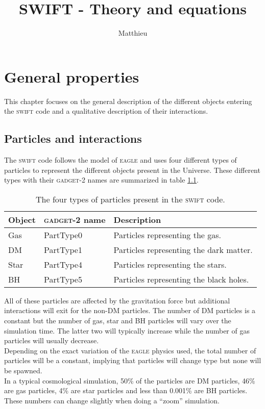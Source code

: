\documentclass[a4paper,10pt]{report}
\title{SWIFT - Theory and equations}
\author{Matthieu}
\newcommand{\swift}{\textsc{swift }}
\newcommand{\eagle}{\textsc{eagle }}
\newcommand{\gadget}{\textsc{gadget-2 }}
\begin{document}
\maketitle





\chapter{General properties}
\label{chap:intro}

This chapter focuses on the general description of the different objects entering the \swift code and a qualitative
description of their interactions.

\section{Particles and interactions}

The \swift code follows the model of \eagle and uses four different types of particles to represent the different
objects present in the Universe. These different types with their \gadget names are summarized in table
\ref{tab:parttypes}.

\begin{table}[h]
\centering

\begin{tabular}{|l|l|l|}
\hline
\textbf{Object} & \textbf{\gadget name} & \textbf{Description} \\
\hline
Gas & PartType0 & Particles representing the gas.\\
DM & PartType1 & Particles representing the dark matter.\\
Star & PartType4 & Particles representing the stars.\\
BH & PartType5 & Particles representing the black holes.\\
\hline
\end{tabular}
\caption{\label{tab:parttypes}The four types of particles present in the \swift code.}
\end{table}

All of these particles are affected by the gravitation force but additional interactions will exit for the non-DM
particles. The number of DM particles is a constant but the number of gas, star and BH particles will vary
over the simulation time. The latter two will typically increase while the number of gas particles will usually
decrease. \\
Depending on the exact variation of the \eagle physics used, the total number of particles will be a
constant, implying that particles will change type but none will be spawned. \\
In a typical cosmological simulation, 50\% of the particles are DM particles, 46\% are gas particles, 4\% are star
particles and less than 0.001\% are BH particles. These numbers can change slightly when doing a ``zoom'' simulation.\\
\end{document}
